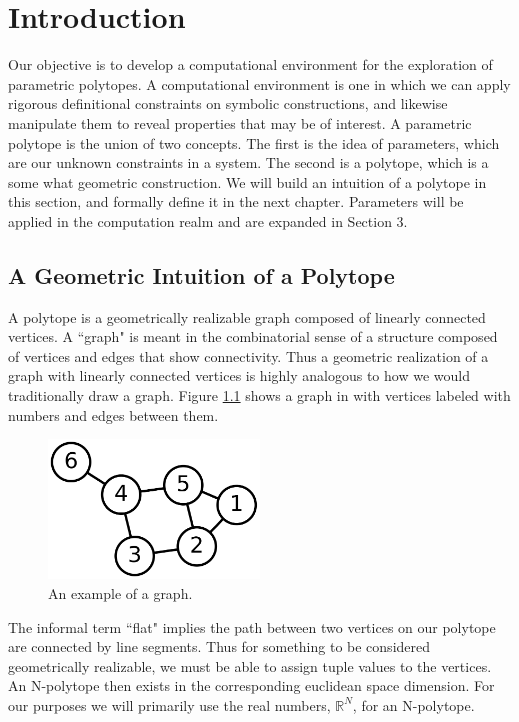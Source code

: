 \chapter{Introduction}

Our objective is to develop a computational environment for the exploration
of parametric polytopes. A computational environment is one in which
we can apply rigorous definitional constraints on symbolic constructions, and
likewise manipulate them to reveal properties that may be of interest.
A parametric polytope is the union of two concepts. The first is the idea
of parameters, which are our unknown constraints in a system. The second
is a polytope, which is a some what geometric construction. We will
build an intuition of a polytope in this section, and formally define it
in the next chapter. Parameters will be applied in the computation realm
and are expanded in Section 3.


\section{A Geometric Intuition of a Polytope}

A polytope is a geometrically realizable graph composed
of linearly connected vertices\cite{Coxeter}.
A ``graph" is meant in the combinatorial sense of a structure composed of
vertices and edges that show connectivity. Thus a geometric realization
of a graph with linearly connected vertices is highly analogous to how we would traditionally
draw a graph. Figure \ref{fig:graph} shows a graph in with vertices labeled
with numbers and edges between them.

\begin{figure}[h!]
  \centering
    \includegraphics[width=0.5\textwidth]{img/6graph.png}
  \caption{An example of a graph.}
  \label{fig:graph}
\end{figure}

The informal term ``flat" implies the path between two vertices
on our polytope are connected by line segments. Thus for something to be
considered geometrically realizable, we must be able to assign tuple values
to the vertices. An N-polytope then exists in the corresponding euclidean
space dimension. For our purposes we will primarily use the real numbers,
$\mathbb{R}^N$, for an N-polytope.

